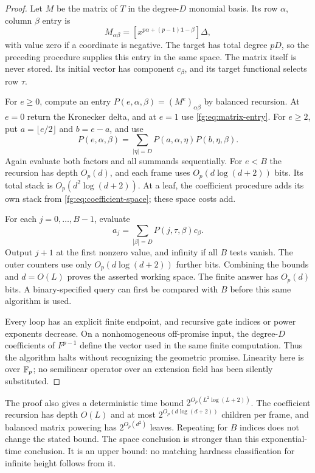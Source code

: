 \begin{proof}
Let $M$ be the matrix of $T$ in the degree-$D$ monomial basis. Its row
$\alpha$, column $\beta$ entry is
\begin{equation}\label{fg:eq:matrix-entry}
 M_{\alpha\beta}
 =[x^{p\alpha+(p-1)\mathbf1-\beta}]\Delta,
\end{equation}
with value zero if a coordinate is negative. The target has total
degree $pD$, so the preceding procedure supplies this entry in the
same space. The matrix itself is never stored. Its initial vector has
component $c_\beta$, and its target functional selects row $\tau$.

For $e\ge0$, compute an entry $P(e,\alpha,\beta)=(M^e)_{\alpha\beta}$
by balanced recursion. At $e=0$ return the Kronecker delta, and at
$e=1$ use \eqref{fg:eq:matrix-entry}. For $e\ge2$, put
$a=\lfloor e/2\rfloor$ and $b=e-a$, and use
\[
 P(e,\alpha,\beta)=\sum_{|\eta|=D}
                   P(a,\alpha,\eta)P(b,\eta,\beta).
\]
Again evaluate both factors and all summands sequentially. For $e<B$
the recursion has depth $O_p(d)$, and each frame uses
$O_p(d\log(d+2))$ bits. Its total stack is
$O_p(d^2\log(d+2))$. At a leaf, the coefficient procedure adds its
own stack from \eqref{fg:eq:coefficient-space}; these space costs add.

For each $j=0,\ldots,B-1$, evaluate
\[
 a_j=\sum_{|\beta|=D}P(j,\tau,\beta)c_\beta.
\]
Output $j+1$ at the first nonzero value, and infinity if all $B$ tests
vanish. The outer counters use only $O_p(d\log(d+2))$ further bits.
Combining the bounds and $d=O(L)$ proves the asserted working space.
The finite answer has $O_p(d)$ bits. A binary-specified query can first
be compared with $B$ before this same algorithm is used.

Every loop has an explicit finite endpoint, and recursive gate indices
or power exponents decrease. On a nonhomogeneous off-promise input,
the degree-$D$ coefficients of $F^{p-1}$ define the vector used in the
same finite computation. Thus the algorithm halts without recognizing
the geometric promise. Linearity here is over $\mathbb F_p$; no semilinear
operator over an extension field has been silently substituted.
\end{proof}

The proof also gives a deterministic time bound
$2^{O_p(L^2\log(L+2))}$. The coefficient recursion has depth $O(L)$
and at most $2^{O_p(d\log(d+2))}$ children per frame, and balanced
matrix powering has $2^{O_p(d^2)}$ leaves. Repeating for $B$ indices
does not change the stated bound. The space conclusion is stronger than
this exponential-time conclusion. It is an upper bound: no matching
hardness classification for infinite height follows from it.

